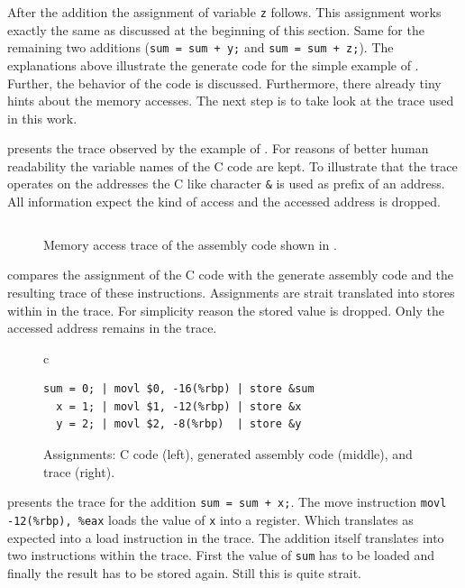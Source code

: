 \documentclass[onecolumn, openright, master, english, signatures]{dbrgrptt}
\begin{document}
After the addition the assignment of variable \texttt{z} follows. This assignment works exactly the same as discussed at the beginning of this section. Same for the remaining two additions (\texttt{sum = sum + y;} and \texttt{sum = sum + z;}). The explanations above illustrate the generate code for the simple example of . Further, the behavior of the code is discussed. Furthermore, there already tiny hints about the memory accesses. The next step is to take look at the \ac{trace} used in this work.

 presents the \ac{trace} observed by the example of . For reasons of better human readability the variable names of the C code are kept. To illustrate that the \ac{trace} operates on the addresses the C like character \texttt{\&} is used as prefix of an address. All information expect the kind of access and the accessed address is dropped.

\begin{figure}[!ht]
  \centering
  \begin{tabular}{c}
  
  \end{tabular}
  \caption{Memory access trace of the assembly code shown in .}
  \label{fig:mat-example-trace}
\end{figure}

 compares the assignment of the C code with the generate assembly code and the resulting \ac{trace} of these instructions. Assignments are strait translated into stores within in the \ac{trace}. For simplicity reason the stored value is dropped. Only the accessed address remains in the \ac{trace}.

\begin{figure}[!ht]
  \centering
  \begin{tabular}{c}
  \begin{lstlisting}
sum = 0; | movl $0, -16(%rbp) | store &sum
  x = 1; | movl $1, -12(%rbp) | store &x
  y = 2; | movl $2, -8(%rbp)  | store &y
  \end{lstlisting}
  \end{tabular}
  \caption{Assignments: C code (left), generated assembly code (middle), and \ac{trace} (right).}
  \label{fig:mat-example-comp-assignment-all}
\end{figure}

 presents the \ac{trace} for the addition \texttt{sum = sum + x;}. The move instruction \texttt{movl -12(\%rbp), \%eax} loads the value of \texttt{x} into a register. Which translates as expected into a load instruction in the \ac{trace}. The addition itself translates into two instructions within the \ac{trace}. First the value of \texttt{sum} has to be loaded and finally the result has to be stored again. Still this is quite strait.
\end{document}
